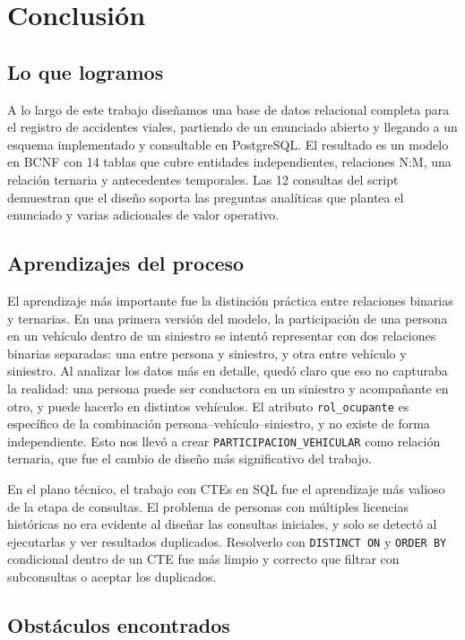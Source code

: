 \documentclass[12pt,a4paper]{article}
\begin{document}
\section{Conclusión}

\subsection*{Lo que logramos}

A lo largo de este trabajo diseñamos una base de datos relacional completa para el registro de accidentes viales, partiendo de un enunciado abierto y llegando a un esquema implementado y consultable en PostgreSQL. El resultado es un modelo en BCNF con 14 tablas que cubre entidades independientes, relaciones N:M, una relación ternaria y antecedentes temporales. Las 12 consultas del script demuestran que el diseño soporta las preguntas analíticas que plantea el enunciado y varias adicionales de valor operativo.

\subsection*{Aprendizajes del proceso}

El aprendizaje más importante fue la distinción práctica entre relaciones binarias y ternarias. En una primera versión del modelo, la participación de una persona en un vehículo dentro de un siniestro se intentó representar con dos relaciones binarias separadas: una entre persona y siniestro, y otra entre vehículo y siniestro. Al analizar los datos más en detalle, quedó claro que eso no capturaba la realidad: una persona puede ser conductora en un siniestro y acompañante en otro, y puede hacerlo en distintos vehículos. El atributo \texttt{rol\_ocupante} es específico de la combinación persona--vehículo--siniestro, y no existe de forma independiente. Esto nos llevó a crear \texttt{PARTICIPACION\_VEHICULAR} como relación ternaria, que fue el cambio de diseño más significativo del trabajo.

En el plano técnico, el trabajo con CTEs en SQL fue el aprendizaje más valioso de la etapa de consultas. El problema de personas con múltiples licencias históricas no era evidente al diseñar las consultas iniciales, y solo se detectó al ejecutarlas y ver resultados duplicados. Resolverlo con \texttt{DISTINCT ON} y \texttt{ORDER BY} condicional dentro de un CTE fue más limpio y correcto que filtrar con subconsultas o aceptar los duplicados.

\subsection*{Obstáculos encontrados}
\end{document}
